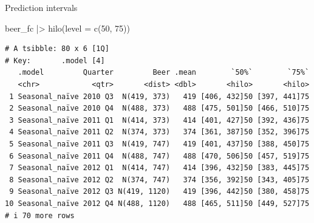 \documentclass[
  14pt,
  ignorenonframetext,
  aspectratio=169,
]{beamer}
\newenvironment{Shaded}{\begin{snugshade}}{\end{snugshade}}
\newcommand{\AttributeTok}[1]{\textcolor[rgb]{0.77,0.63,0.00}{#1}}
\newcommand{\DecValTok}[1]{\textcolor[rgb]{0.00,0.00,0.81}{#1}}
\newcommand{\FunctionTok}[1]{\textcolor[rgb]{0.00,0.00,0.00}{#1}}
\newcommand{\NormalTok}[1]{\textcolor[rgb]{0.00,0.00,0.00}{#1}}
\newcommand{\SpecialCharTok}[1]{\textcolor[rgb]{0.00,0.00,0.00}{#1}}
\renewenvironment{Shaded}{\vspace*{0.15cm}\color{black}\fontsize{10}{10}\sf\begin{snugshade}\color{black}}{\end{snugshade}}
\begin{document}
\begin{frame}[fragile]{Prediction intervals}
\protect\hypertarget{prediction-intervals-2}{}
\fontsize{10}{12}\sf

\begin{Shaded}
\begin{Highlighting}[]
\NormalTok{beer\_fc }\SpecialCharTok{|\textgreater{}}
  \FunctionTok{hilo}\NormalTok{(}\AttributeTok{level =} \FunctionTok{c}\NormalTok{(}\DecValTok{50}\NormalTok{, }\DecValTok{75}\NormalTok{))}
\end{Highlighting}
\end{Shaded}

\begin{verbatim}
# A tsibble: 80 x 6 [1Q]
# Key:       .model [4]
   .model         Quarter         Beer .mean        `50%`        `75%`
   <chr>            <qtr>       <dist> <dbl>       <hilo>       <hilo>
 1 Seasonal_naïve 2010 Q3  N(419, 373)   419 [406, 432]50 [397, 441]75
 2 Seasonal_naïve 2010 Q4  N(488, 373)   488 [475, 501]50 [466, 510]75
 3 Seasonal_naïve 2011 Q1  N(414, 373)   414 [401, 427]50 [392, 436]75
 4 Seasonal_naïve 2011 Q2  N(374, 373)   374 [361, 387]50 [352, 396]75
 5 Seasonal_naïve 2011 Q3  N(419, 747)   419 [401, 437]50 [388, 450]75
 6 Seasonal_naïve 2011 Q4  N(488, 747)   488 [470, 506]50 [457, 519]75
 7 Seasonal_naïve 2012 Q1  N(414, 747)   414 [396, 432]50 [383, 445]75
 8 Seasonal_naïve 2012 Q2  N(374, 747)   374 [356, 392]50 [343, 405]75
 9 Seasonal_naïve 2012 Q3 N(419, 1120)   419 [396, 442]50 [380, 458]75
10 Seasonal_naïve 2012 Q4 N(488, 1120)   488 [465, 511]50 [449, 527]75
# i 70 more rows
\end{verbatim}
\end{frame}
\end{document}
